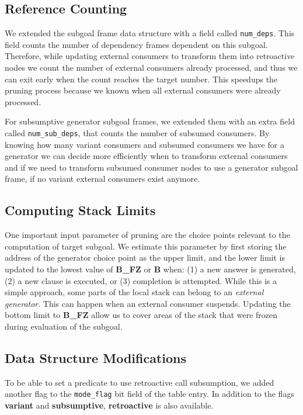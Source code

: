 \subsection{Reference Counting}

We extended the subgoal frame data structure with a field called \texttt{num\_deps}. This field
counts the number of dependency frames dependent on this subgoal. Therefore, while updating
external consumers to transform them into retroactive nodes we count the number of external consumers
already processed, and thus we can exit early when the count reaches the target number. This speedups
the pruning process because we known when all external consumers were already processed.

For subsumptive generator subgoal frames, we extended them with an extra field called \texttt{num\_sub\_deps}, that
counts the number of subsumed consumers. By knowing how many variant consumers and subsumed consumers we
have for a generator we can decide more efficiently when to transform external consumers and if we
need to transform subsumed consumer nodes to use a generator subgoal frame, if no variant external consumers
exist anymore.

\subsection{Computing Stack Limits}

One important input parameter of pruning are the choice points relevant to the
computation of target subgoal. We estimate this parameter by first storing the
address of the generator choice point as the upper limit, and the lower limit is
updated to the lowest value of \textbf{B\_FZ} or \textbf{B} when: (1) a new answer is
generated, (2) a new clause is executed, or (3) completion is attempted. While this
is a simple approach, some parts of the local stack can belong to an
\textit{external generator}. This can happen when an external consumer
suspends. Updating the bottom limit to \textbf{B\_FZ} allow us to cover areas of
the stack that were frozen during evaluation of the subgoal.

\subsection{Data Structure Modifications}

To be able to set a predicate to use retroactive call subsumption, we added another flag to the
\texttt{mode\_flag} bit field of the table entry. In addition to the flags \textbf{variant} and 
\textbf{subsumptive}, \textbf{retroactive} is also available.

